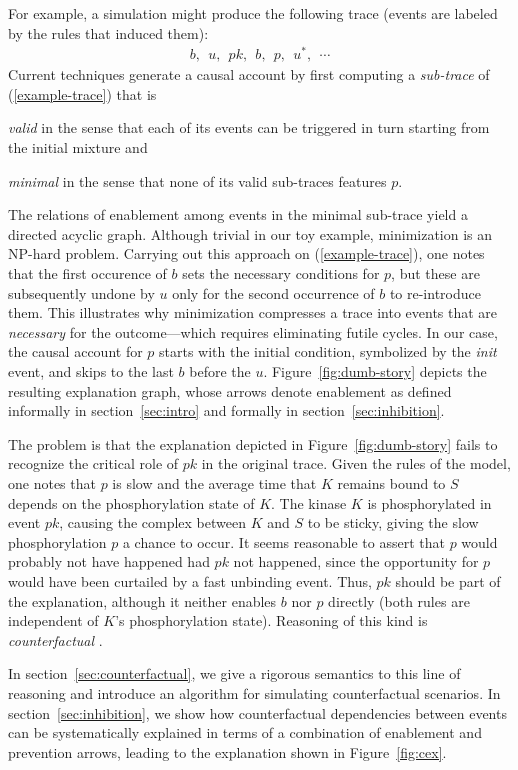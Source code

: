 For example, a simulation might produce the following trace (events
are labeled by the rules that induced them):
\begin{align}
  \label{example-trace} 
  b,\ \ u,\ \ pk,\ \ b,\ \ p,\ \ u^{*},\ \ \cdots
\end{align} 
Current techniques
\cite{DBLP:conf/fsttcs/DanosFFHH12,DanosEtAl-CONCUR07} generate a
causal account by first computing a \emph{sub-trace} of
(\ref{example-trace}) that is
\begin{inparaenum}[(i)]
\item \emph{valid} in the sense that each of its events can be
  triggered in turn starting from the initial mixture and
\item \emph{minimal} in the sense that none of its valid sub-traces
  features $p$.
\end{inparaenum}
The relations of enablement among events in the minimal sub-trace
yield a directed acyclic graph. Although trivial in our toy example,
minimization is an NP-hard problem. Carrying out this approach on
(\ref{example-trace}), one notes that the first occurence of $b$ sets
the necessary conditions for $p$, but these are subsequently undone by
$u$ only for the second occurrence of $b$ to re-introduce them. This
illustrates why minimization compresses a trace into events that are
\emph{necessary} for the outcome---which requires eliminating futile
cycles. In our case, the causal account for $p$ starts with the
initial condition, symbolized by the \emph{init} event, and skips to
the last $b$ before the $u$. Figure~\ref{fig:dumb-story} depicts the
resulting explanation graph, whose arrows denote enablement as defined
informally in section~\ref{sec:intro} and formally in
section~\ref{sec:inhibition}.



The problem is that the explanation depicted in
Figure~\ref{fig:dumb-story} fails to recognize the critical role of
$pk$ in the original trace. Given the rules of the model, one notes
that $p$ is slow and the average time that $K$ remains bound to $S$
depends on the phosphorylation state of $K$. The kinase $K$ is
phosphorylated in event $pk$, causing the complex between $K$ and $S$
to be sticky, giving the slow phosphorylation $p$ a chance to
occur. It seems reasonable to assert that $p$ would probably not have
happened had $pk$ not happened, since the opportunity for $p$ would
have been curtailed by a fast unbinding event. Thus, $pk$ should be
part of the explanation, although it neither enables $b$ nor $p$
directly (both rules are independent of $K$'s phosphorylation
state). Reasoning of this kind is \emph{counterfactual}
\cite{lewis1974causation,pearl2009causality}.

In section~\ref{sec:counterfactual}, we give a rigorous semantics to
this line of reasoning and introduce an algorithm for simulating
counterfactual scenarios. In section~\ref{sec:inhibition}, we show how
counterfactual dependencies between events can be systematically
explained in terms of a combination of enablement and prevention
arrows, leading to the explanation shown in Figure~\ref{fig:cex}. 
